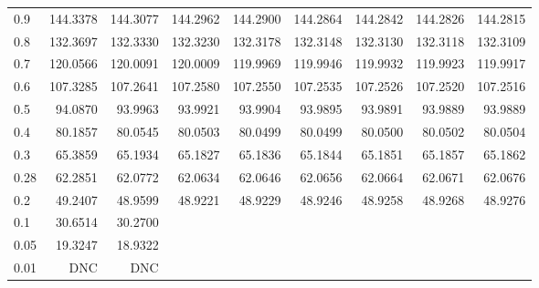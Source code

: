 \begin{landscape}
\begin{table}
\begin{center}
\begin{tabular}{l|rrrrrrrr}
0.9 &  144.3378 & 144.3077 & 144.2962 & 144.2900 & 144.2864 & 144.2842 & 144.2826 & 144.2815 \\ 
0.8 &  132.3697 & 132.3330 & 132.3230 & 132.3178 & 132.3148 & 132.3130 & 132.3118 & 132.3109 \\ 
0.7 &  120.0566 & 120.0091 & 120.0009 & 119.9969 & 119.9946 & 119.9932 & 119.9923 & 119.9917 \\ 
0.6 &  107.3285 & 107.2641 & 107.2580 & 107.2550 & 107.2535 & 107.2526 & 107.2520 & 107.2516 \\ 
0.5 &   94.0870 &  93.9963 &  93.9921 &  93.9904 &  93.9895 &  93.9891 &  93.9889 &  93.9889 \\ 
0.4 &   80.1857 &  80.0545 &  80.0503 &  80.0499 &  80.0499 &  80.0500 &  80.0502 &  80.0504 \\ 
0.3 &   65.3859 &  65.1934 &  65.1827 &  65.1836 &  65.1844 &  65.1851 &  65.1857 &  65.1862 \\ 
0.28 &  62.2851 &  62.0772 &  62.0634 &  62.0646 &  62.0656 &  62.0664 &  62.0671 &  62.0676 \\ 
0.2 &   49.2407 &  48.9599 &  48.9221 &  48.9229 &  48.9246 &  48.9258 &  48.9268 &  48.9276 \\ 
0.1 &   30.6514 &  30.2700 &  \\                                          
0.05 &  19.3247 &  18.9322  \\ 
0.01 &      DNC &      DNC  \\ 
\hline \hline
\end{tabular}
\end{center}
\end{table}
\end{landscape}






